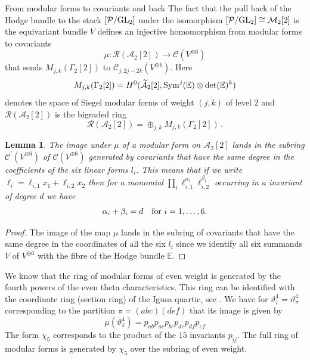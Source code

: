 \documentclass[12pt]{amsart}
\numberwithin{equation}{section}
\newcommand{\EE}{\mathbb E}
\numberwithin{equation}{section}
\newtheorem{lemma}[theorem]{Lemma}
\theoremstyle{definition}
\theoremstyle{remark}
\begin{document}
\begin{section}{From modular forms to covariants and back}
The fact that the pull back of the Hodge bundle to the stack $[\mathcal{P}/{\rm GL}_2]$ under the isomorphism
 $[\mathcal{P}/{\rm GL}_2]\cong \mathcal{M}_2[2]$
is the equivariant bundle $V$
defines an injective homomorphism from modular forms to covariants
$$
\mu: \mathcal{R}(\mathcal{A}_2[2]) \to \mathcal{C}(V^{\oplus 6})
$$
that sends $M_{j,k}(\Gamma_2[2])$ to $\mathcal{C}_{j,2j-2k}(V^{\oplus 6})$. Here 
$$
M_{j,k}(\Gamma_2[2])=H^0(\widetilde{\mathcal{A}}_2[2], {\rm Sym}^j({\EE}) \otimes \det({\EE})^k)
$$ 
denotes the space of Siegel
modular forms of weight $(j,k)$ of level $2$ and $\mathcal{R}(\mathcal{A}_2[2])$ is the bigraded ring
$$
\mathcal{R}(\mathcal{A}_2[2])=\oplus_{j,k} M_{j,k}(\Gamma_2[2])\, .
$$
\begin{lemma} \label{degreeforscalar}
The image under $\mu$ of a modular form on $\mathcal{A}_2[2]$ lands in the subring $\mathcal{C}^{\prime}(V^{\oplus 6})$
 of   $\mathcal{C}(V^{\oplus 6})$ generated by covariants that have the same degree in the coefficients
of the six linear forms $l_i$.
This means that if we write $\ell_i=\ell_{i,1}x_1+\ell_{i,2}x_2$ then for a monomial
$\prod_i\ell_{i,1}^{\alpha_i}\ell_{i,2}^{\beta_i}$ occurring in a invariant of degree $d$ 
we have 
\begin{equation}\label{samedegree}
\alpha_i+\beta_i=d \quad \text{\rm for $i=1,\ldots,6$.}
\end{equation}
\end{lemma}
\begin{proof}
The image of the map $\mu$ lands in the subring of covariants that have the same degree
in the coordinates of all the six $l_i$ since we identify all six summands $V$ of $V^{\oplus 6}$
with the fibre of the Hodge bundle ${\EE}$.   
\end{proof}


We know that the ring of modular forms of even weight is generated by the fourth powers of the even theta characteristics. This ring can be identified with the coordinate ring
(section ring) of the Igusa quartic, see \cite{CvdGG,vdG}.
We have for $\vartheta^4_i=\vartheta_{\pi}^4$ 
corresponding to the partition $\pi=(abc)(def)$ that its image is given by
\begin{equation}\label{sixpij}
\mu(\vartheta_{\pi}^4)=p_{ab}p_{ac}p_{bc}p_{de}p_{df}p_{ef}
\end{equation}
The form $\chi_5$ corresponds to the product of the $15$ invariants $p_{ij}$. The
full ring of modular forms is generated by $\chi_5$ over the subring of even weight.


\end{section}
\end{document}

